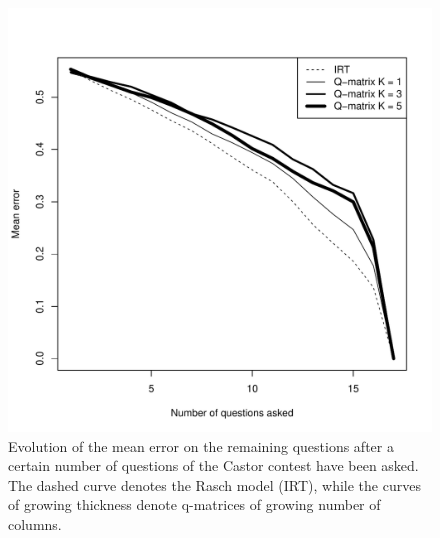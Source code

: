 \documentclass{sig-alternate}
\begin{document}

\begin{figure}
\includegraphics[width=\linewidth]{castor.pdf}
\caption{Evolution of the mean error on the remaining questions after a certain number of questions of the Castor contest have been asked. The dashed curve denotes the Rasch model (IRT), while the curves of growing thickness denote q-matrices of growing number of columns.}
\label{fig:castor}
\end{figure}
\end{document}
